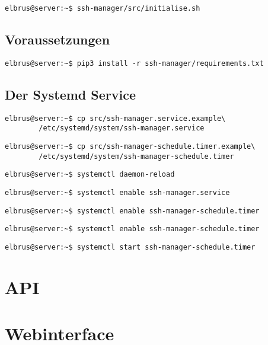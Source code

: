 \documentclass{article}
\begin{document}
	\lstset{style=commands}	
	\begin{lstlisting}[caption={Ausführen des Scripts zur Initialisierung des VCS Verzeichnisses.}]
		elbrus@server:~$ ssh-manager/src/initialise.sh
	\end{lstlisting}

	\subsection[dependencies]{Voraussetzungen}
	\begin{lstlisting}[caption={Installieren von fehlenden python3 Packages.}]
		elbrus@server:~$ pip3 install -r ssh-manager/requirements.txt
	\end{lstlisting}

	\newpage
	\subsection[systemd service]{Der Systemd Service}
	\begin{lstlisting}[caption={Kopieren des Serviceprogrammes}]
		elbrus@server:~$ cp src/ssh-manager.service.example\
		/etc/systemd/system/ssh-manager.service
	\end{lstlisting}

	\begin{lstlisting}[caption={Kopieren des Zeitplanungsprogrammes.}]
		elbrus@server:~$ cp src/ssh-manager-schedule.timer.example\
		/etc/systemd/system/ssh-manager-schedule.timer
	\end{lstlisting}

	\begin{lstlisting}[caption={Neuladen des 'systemctl' Deamons}]
		elbrus@server:~$ systemctl daemon-reload
	\end{lstlisting}

	\begin{lstlisting}[caption={Aktivieren des Serviceprogrammes}]
		elbrus@server:~$ systemctl enable ssh-manager.service
	\end{lstlisting}

	\begin{lstlisting}[caption={Aktivieren des Zeitplanungsprogrammes}]
		elbrus@server:~$ systemctl enable ssh-manager-schedule.timer
	\end{lstlisting}

	\begin{lstlisting}[caption={Aktivieren des Zeitplanungsprogrammes}]
		elbrus@server:~$ systemctl enable ssh-manager-schedule.timer
	\end{lstlisting}

	\begin{lstlisting}[caption={Starten des Zeitplanungsprogrammes}]
		elbrus@server:~$ systemctl start ssh-manager-schedule.timer
	\end{lstlisting}
	\newpage
	
	\section{API}
	\newpage
	
	\section{Webinterface}
	\newpage
\end{document}

